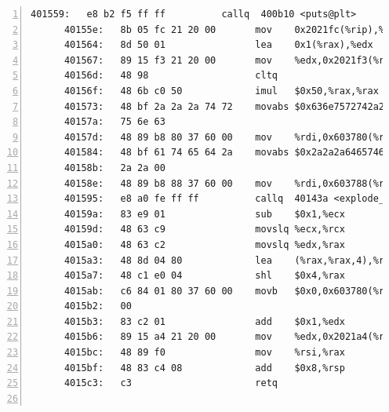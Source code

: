 \documentclass{article}
\begin{document}
\begin{lstlisting}[title = bomb的反汇编代码及部分注释, xleftmargin = 2em,xrightmargin = 2em, aboveskip = 1em, numbers = left, basicstyle=\scriptsize\ttfamily, numberstyle=\scriptsize]
      401559:	e8 b2 f5 ff ff       	callq  400b10 <puts@plt>
      40155e:	8b 05 fc 21 20 00    	mov    0x2021fc(%rip),%eax        # 603760 <num_input_strings>
      401564:	8d 50 01             	lea    0x1(%rax),%edx
      401567:	89 15 f3 21 20 00    	mov    %edx,0x2021f3(%rip)        # 603760 <num_input_strings>
      40156d:	48 98                	cltq   
      40156f:	48 6b c0 50          	imul   $0x50,%rax,%rax
      401573:	48 bf 2a 2a 2a 74 72 	movabs $0x636e7572742a2a2a,%rdi
      40157a:	75 6e 63 
      40157d:	48 89 b8 80 37 60 00 	mov    %rdi,0x603780(%rax)
      401584:	48 bf 61 74 65 64 2a 	movabs $0x2a2a2a64657461,%rdi
      40158b:	2a 2a 00 
      40158e:	48 89 b8 88 37 60 00 	mov    %rdi,0x603788(%rax)
      401595:	e8 a0 fe ff ff       	callq  40143a <explode_bomb>
      40159a:	83 e9 01             	sub    $0x1,%ecx
      40159d:	48 63 c9             	movslq %ecx,%rcx
      4015a0:	48 63 c2             	movslq %edx,%rax
      4015a3:	48 8d 04 80          	lea    (%rax,%rax,4),%rax
      4015a7:	48 c1 e0 04          	shl    $0x4,%rax
      4015ab:	c6 84 01 80 37 60 00 	movb   $0x0,0x603780(%rcx,%rax,1)
      4015b2:	00 
      4015b3:	83 c2 01             	add    $0x1,%edx
      4015b6:	89 15 a4 21 20 00    	mov    %edx,0x2021a4(%rip)        # 603760 <num_input_strings>
      4015bc:	48 89 f0             	mov    %rsi,%rax
      4015bf:	48 83 c4 08          	add    $0x8,%rsp
      4015c3:	c3                   	retq   
    

\end{lstlisting}
\end{document}
